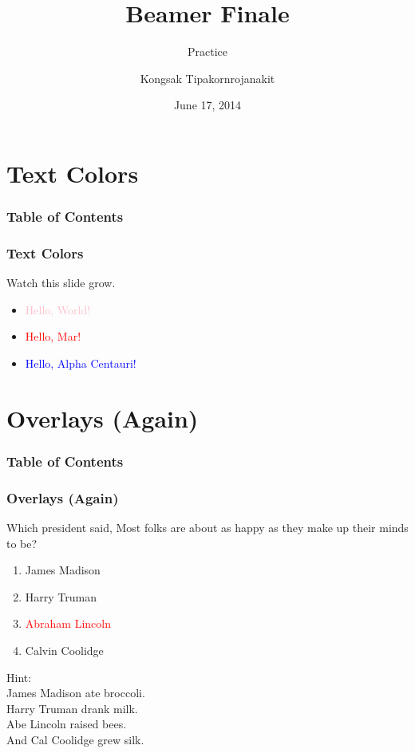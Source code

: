 \documentclass{beamer}
\title{Beamer Finale}
\subtitle{Practice}
\author{Kongsak Tipakornrojanakit}
\institute{Mahidol University, International College}
\date{June 17, 2014}
\theoremstyle{plain}
\begin{document}
\begin{frame}
\titlepage
\end{frame}

\section{Text Colors}
\begin{frame}
\frametitle{Table of Contents}
\tableofcontents[currentsection]
\end{frame}

\begin{frame}
\frametitle{Text Colors}
Watch this slide grow.

\begin{itemize}
\item<2-> \textcolor{pink}{Hello, World!}
\item<3-> \textcolor{red}{Hello, Mar!}
\item<4-> \textcolor{blue}{Hello, Alpha Centauri!}
\end{itemize}

\end{frame}

\section{Overlays (Again)}
\begin{frame}
\frametitle{Table of Contents}
\tableofcontents[currentsection]
\end{frame}

\begin{frame}
\frametitle{Overlays (Again)}
Which president said, Most folks are about as happy as they make up their minds to be?

\begin{enumerate}[A]
\item<2-5> James Madison
\item<3-5> Harry Truman
\item<4-6> \textcolor<6>{red}{Abraham Lincoln} 
\item<5-5> Calvin Coolidge
\end{enumerate}

 Hint: \\
 James Madison ate broccoli.\\
 Harry Truman drank milk.\\
 Abe Lincoln raised bees.\\
 And Cal Coolidge grew silk.
\end{frame}
\end{document}
